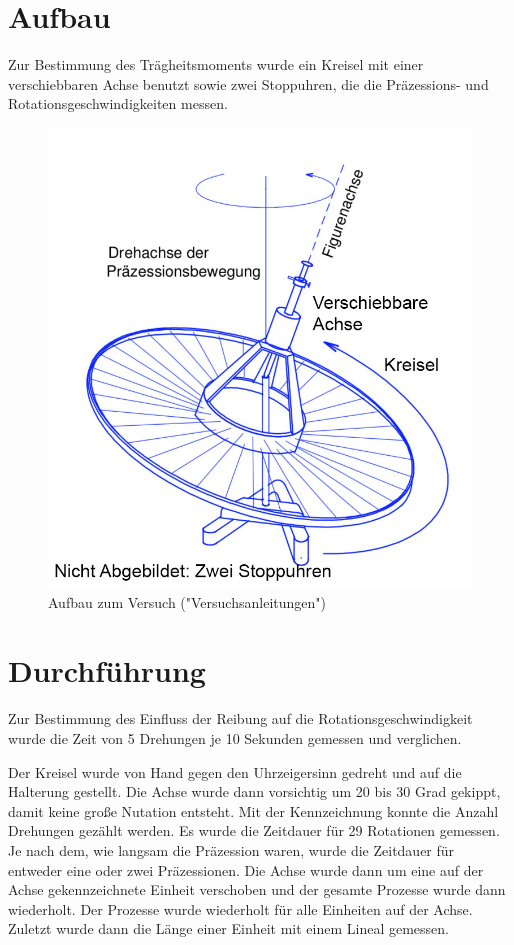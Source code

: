 \documentclass[11pt,a4paper]{article} %
\begin{document}
\section{Aufbau}
Zur Bestimmung des Trägheitsmoments wurde ein Kreisel mit einer verschiebbaren Achse benutzt sowie zwei Stoppuhren, die die Präzessions- und Rotationsgeschwindigkeiten messen. 
\begin{figure}[h]
	\centering
	\includegraphics[scale=0.5]{Abb}
	\caption{Aufbau zum Versuch ("Versuchsanleitungen")}
\end{figure}

\section{Durchführung}
Zur Bestimmung des Einfluss der Reibung auf die Rotationsgeschwindigkeit wurde die Zeit von 5 Drehungen je 10 Sekunden gemessen und verglichen. 

Der Kreisel wurde von Hand gegen den Uhrzeigersinn gedreht und auf die Halterung gestellt. Die Achse wurde dann vorsichtig um 20 bis 30 Grad gekippt, damit keine große Nutation entsteht. Mit der Kennzeichnung konnte die Anzahl Drehungen gezählt werden. Es wurde die Zeitdauer für 29 Rotationen gemessen. Je nach dem, wie langsam die Präzession waren, wurde die Zeitdauer für entweder eine oder zwei Präzessionen. Die Achse wurde dann um eine auf der Achse gekennzeichnete Einheit verschoben und der gesamte Prozesse wurde dann wiederholt. Der Prozesse wurde wiederholt für alle Einheiten auf der Achse. Zuletzt wurde dann die Länge einer Einheit mit einem Lineal gemessen. 
\end{document}
